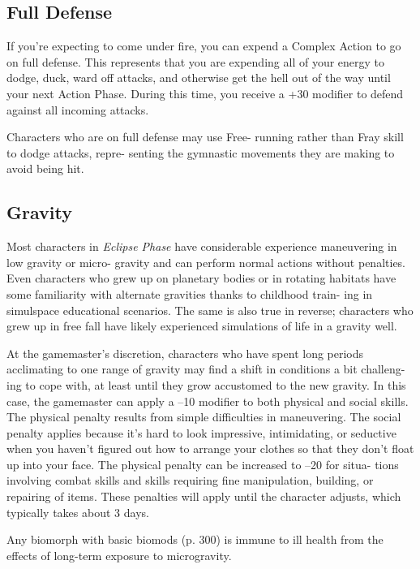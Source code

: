 \subsection{Full Defense}

If you're expecting to come under fire, you can 
expend a Complex Action to go on full defense. This 
represents that you are expending all of your energy 
to dodge, duck, ward off attacks, and otherwise get 
the hell out of the way until your next Action Phase. 
During this time, you receive a +30 modifier to defend 
against all incoming attacks.

Characters who are on full defense may use Free-
running rather than Fray skill to dodge attacks, repre-
senting the gymnastic movements they are making to 
avoid being hit.

\subsection{Gravity}

Most characters in \textit{Eclipse Phase} have considerable 
experience maneuvering in low gravity or micro-
gravity and can perform normal actions without 
penalties. Even characters who grew up on planetary 
bodies or in rotating habitats have some familiarity 
with alternate gravities thanks to childhood train-
ing in simulspace educational scenarios. The same is 
also true in reverse; characters who grew up in free 
fall have likely experienced simulations of life in a 
gravity well.

At the gamemaster's discretion, characters who 
have spent long periods acclimating to one range of 
gravity may find a shift in conditions a bit challeng-
ing to cope with, at least until they grow accustomed 
to the new gravity. In this case, the gamemaster can 
apply a –10 modifier to both physical and social skills. 
The physical penalty results from simple difficulties 
in maneuvering. The social penalty applies because 
it's hard to look impressive, intimidating, or seductive 
when you haven't figured out how to arrange your 
clothes so that they don't float up into your face. The 
physical penalty can be increased to –20 for situa-
tions involving combat skills and skills requiring fine 
manipulation, building, or repairing of items. These 
penalties will apply until the character adjusts, which 
typically takes about 3 days.

Any biomorph with basic biomods (p. 300) is 
immune to ill health from the effects of long-term 
exposure to microgravity.

